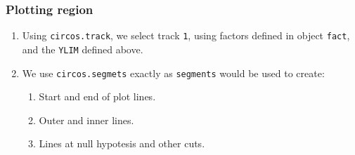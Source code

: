 \documentclass[
]{article}
\providecommand{\tightlist}{%
  \setlength{\itemsep}{0pt}\setlength{\parskip}{0pt}}
\begin{document}
\hypertarget{plotting-region}{%
\subsubsection{Plotting region}\label{plotting-region}}

\begin{enumerate}
\def\labelenumi{\arabic{enumi}.}
\tightlist
\item
  Using \texttt{circos.track}, we select track \texttt{1}, using factors
  defined in object \texttt{fact}, and the \texttt{YLIM} defined
  above.\\
\item
  We use \texttt{circos.segmets} exactly as \texttt{segments} would be
  used to create:

  \begin{enumerate}
  \def\labelenumii{\roman{enumii})}
  \tightlist
  \item
    Start and end of plot lines.\\
  \item
    Outer and inner lines.\\
  \item
    Lines at null hypotesis and other cuts.
  \end{enumerate}
\end{enumerate}
\end{document}
